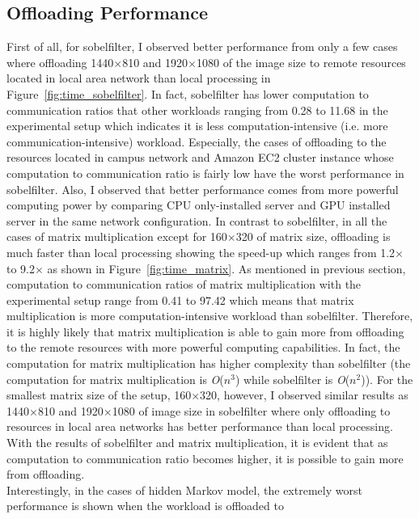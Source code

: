 \subsection{Offloading Performance}
\label{character:perf}
%
First of all, for sobelfilter, I observed better performance from
only a few cases where offloading 1440$\times$810 and 1920$\times$1080
of the image size to remote resources located in local area network
than local processing in Figure~\ref{fig:time_sobelfilter}. 
%
In fact, sobelfilter has lower computation to communication
ratios that other workloads ranging from 0.28 to 11.68 in the
experimental setup which indicates it is less computation-intensive 
(i.e. more communication-intensive) workload.
%
Especially, the cases of offloading to the resources located in campus
network and Amazon EC2 cluster instance whose computation to
communication ratio is fairly low have the worst performance in
sobelfilter.  
%
Also, I observed that better performance comes from more powerful
computing power by comparing CPU only-installed server and GPU installed
server in the same network configuration.
%
In contrast to sobelfilter, in all the cases of matrix
multiplication except for 160$\times$320 of matrix size, offloading is
much faster than local processing showing the speed-up which ranges from
1.2$\times$ to 9.2$\times$ as shown in Figure~\ref{fig:time_matrix}.
%
As mentioned in previous section, computation to communication ratios 
of matrix multiplication with the experimental setup range from 0.41 to 97.42 
which means that matrix multiplication is more computation-intensive workload 
than sobelfilter. 
%
Therefore, it is highly likely that matrix multiplication is able to
gain more from offloading to the remote resources with more powerful
computing capabilities.
%
In fact, the computation for matrix multiplication has higher complexity
than sobelfilter (the computation for matrix multiplication is
{\it O}($n^{3}$) while sobelfilter is {\it O}($n^{2}$)).
%
For the smallest matrix size of the setup, 160$\times$320, however,
I observed similar results as 1440$\times$810 and 1920$\times$1080 of
image size in sobelfilter where only offloading to resources in local
area networks has better performance than local processing.
%
With the results of sobelfilter and matrix multiplication, it is evident
that as computation to communication ratio becomes higher, 
it is possible to gain more from offloading.\\
%
Interestingly, in the cases of hidden Markov model, the
extremely worst performance is shown when the workload is offloaded to
